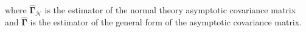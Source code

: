 \noindent where
$\hat{\boldsymbol{\Gamma}}_{\mathcal{N}}$
is the estimator
of the normal theory asymptotic covariance matrix
and
$\hat{\boldsymbol{\Gamma}}$
is the estimator
of the general form of the asymptotic covariance matrix.
